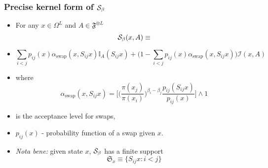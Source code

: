 
\begin{frame}
		\frametitle{ Precise kernel form of $\mathcal{S}_{\beta}$}

	\begin{itemize}
		\item[] For any $x \in \Omega^L$ and $A \in \mathfrak{F}^{\otimes L}$ 
	$$\mathcal{S}_{\beta}(x, A) \equiv$$
		\item[]
$$\underset{ i < j}{\sum} p_{ij}(x) \alpha_\text{swap} (x, S_{ij}x) \mathbb{I}_A(S_{ij} x) + \Big( 1 - \underset{ i < j}{\sum} p_{ij}(x) \alpha_\text{swap} (x, S_{ij}x)\Big) \mathcal{I}(x,A)$$

		\item[] where 
$$\alpha_\text{swap}(x,S_{ij} x) = \Big[  \Big(\frac{\pi(x_j)}{\pi(x_i)} \Big)^{\beta_i - \beta_j}  \frac{ p_{ij}(S_{ij} x )}{ p_{ij}( x ) }\Big] \wedge 1$$
		\item[] is the acceptance level for swaps, 
		\item[] $p_{ij}( x )$ - probability function of a swap given $x$. 
		\item[] \emph{Nota bene:} given state $x$, $\mathcal{S}_{\beta}$ has a finite support 
	$$\mathfrak{S}_x \equiv\{ S_{ij} x : i <j \}$$
	\end{itemize}

\end{frame}

